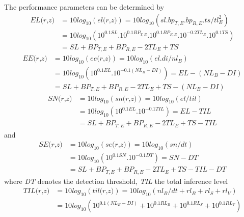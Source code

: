 \noindent The performance parameters can be determined by
\begin{equation}
\begin{split}
\textit{EL(r,z)} & = 10 log_{10}{(\textit{el(r,z)})} = 10log_{10}{(sl  .  bp_{T,E}  .  bp_{R,E}  .  ts / tl_{E}^{2})} \\
 & = 10log_{10}{( 10^{0.1 SL} . 10^{0.1 BP_{T,E}} . 10^{0.1 BP_{R,E}} . 10^{-0.2 TL_{E}} . 10^{0.1 TS} )} \\
 & = SL + BP_{T,E} + BP_{R,E} - 2TL_{E} + TS
\end{split}
\end{equation} 
\begin{equation}
\begin{split}
\textit{EE(r,z)} & = 10 log_{10}{(\textit{ee(r,z)})} = 10log_{10}{(el . di / nl_{B} )} \\
 & = 10log_{10}{( 10^{0.1 EL} . 10^{-0.1 (NL_{B} - DI)}) = EL - ( NL_{B} - DI)} \\
 & = SL + BP_{T,E} + BP_{R,E} - 2TL_{E} + TS - ( NL_{B} - DI)
\end{split}
\end{equation} 
\begin{equation}
\begin{split}
\textit{SN(r,z)} & = 10 log_{10}{(\textit{sn(r,z)})} = 10log_{10}{(el / til )} \\
 & = 10log_{10}{( 10^{0.1 EL} . 10^{-0.1 TIL})} = EL - TIL \\
 & = SL + BP_{T,E} + BP_{R,E} - 2TL_{E} + TS - TIL
\end{split}
\end{equation} 
\noindent and
\begin{equation}
\begin{split}
\textit{SE(r,z)} & = 10 log_{10}{(\textit{se(r,z)})} = 10log_{10}{(sn / dt)} \\
 & = 10log_{10}{( 10^{0.1 SN} . 10^{-0.1 DT})} = SN - DT \\
 & = SL + BP_{T,E} + BP_{R,E} - 2TL_{E} + TS - TIL - DT
\end{split}
\end{equation} 
\noindent where \textit{DT} denotes the detection threshold, \textit{TIL} the total inference level
\begin{equation}
\begin{split}
\textit{TIL(r,z)} & = 10 log_{10}{(\textit{til(r,z)})} = 10log_{10}{( nl_{B} / dt + rl_{B} + rl_{S} + rl_{V} )} \\
 & = 10log_{10}{( 10^{0.1 (NL_{B} - DI)} + 10^{0.1 RL_{B}} + 10^{0.1 RL_{S}} + 10^{0.1 RL_{V}})} 
\end{split}
\end{equation} 
